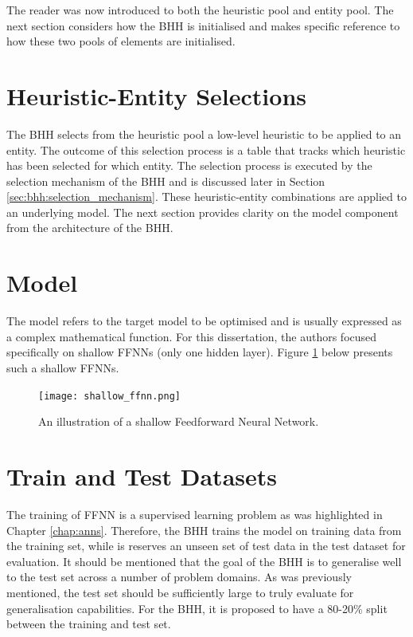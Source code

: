 The reader was now introduced to both the heuristic pool and entity pool. The next section considers how the \ac{BHH} is initialised and makes specific reference to how these two pools of elements are initialised.

\section{Heuristic-Entity Selections}
\label{sec:bhh:heuristic_entity_selections}

The \ac{BHH} selects from the heuristic pool a low-level heuristic to be applied to an entity. The outcome of this selection process is a table that tracks which heuristic has been selected for which entity. The selection process is executed by the selection mechanism of the \ac{BHH} and is discussed later in Section \ref{sec:bhh:selection_mechanism}. These heuristic-entity combinations are applied to an underlying model. The next section provides clarity on the model component from the architecture of the \ac{BHH}.

\section{Model}
\label{sec:bhh:model}

The model refers to the target model to be optimised and is usually expressed as a complex mathematical function. For this dissertation, the authors focused specifically on shallow \acp{FFNN} (only one hidden layer). Figure \ref{fig:shallow_ffnn} below presents such a shallow \acp{FFNN}.

\begin{figure}[H]
    \centering
    \texttt{[image: shallow\_ffnn.png]}
    \caption[Shallow Feedforward Neural Network]{An illustration of
    a shallow Feedforward Neural Network.}
    \label{fig:shallow_ffnn}
\end{figure}

\section{Train and Test Datasets}
\label{sec:bhh:train_test_datasets}

The training of \ac{FFNN} is a supervised learning problem as was highlighted in Chapter \ref{chap:anns}. Therefore, the \ac{BHH} trains the model on training data from the training set, while is reserves an unseen set of test data in the test dataset for evaluation. It should be mentioned that the goal of the \ac{BHH} is to generalise well to the test set across a number of problem domains. As was previously mentioned, the test set should be sufficiently large to truly evaluate for generalisation capabilities. For the \ac{BHH}, it is proposed to have a 80-20\% split between the training and test set. 


